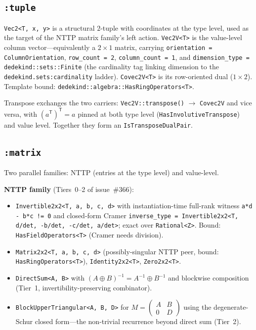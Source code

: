 \documentclass[11pt, a4paper]{report}
\begin{document}
\subsection{\texttt{:tuple}}

\texttt{Vec2<T, x, y>} is a structural $2$-tuple with coordinates at the type level, used as the target of the NTTP matrix family's left action. \texttt{Vec2V<T>} is the value-level column vector---equivalently a $2 \times 1$ matrix, carrying \texttt{orientation = ColumnOrientation}, \texttt{row\_count = 2}, \texttt{column\_count = 1}, and \texttt{dimension\_type = dedekind::sets::Finite} (the cardinality tag linking dimension to the \texttt{dedekind.sets:cardinality} ladder). \texttt{Covec2V<T>} is its row-oriented dual ($1 \times 2$). Template bound: \texttt{dedekind::algebra::HasRingOperators<T>}.

Transpose exchanges the two carriers: \texttt{Vec2V::transpose()} $\to$ \texttt{Covec2V} and vice versa, with $(a^{\mathsf{T}})^{\mathsf{T}} = a$ pinned at both type level (\texttt{HasInvolutiveTranspose}) and value level. Together they form an \texttt{IsTransposeDualPair}.

\subsection{\texttt{:matrix}}

Two parallel families: NTTP (entries at the type level) and value-level.

\textbf{NTTP family} (Tiers~0--2 of issue~\#366):
\begin{itemize}
  \item \texttt{Invertible2x2<T, a, b, c, d>} with instantiation-time full-rank witness \texttt{a*d - b*c != 0} and closed-form Cramer \texttt{inverse\_type = Invertible2x2<T, d/det, -b/det, -c/det, a/det>}; exact over \texttt{Rational<Z>}. Bound: \texttt{HasFieldOperators<T>} (Cramer needs division).
  \item \texttt{Matrix2x2<T, a, b, c, d>} (possibly-singular NTTP peer, bound: \texttt{HasRingOperators<T>}), \texttt{Identity2x2<T>}, \texttt{Zero2x2<T>}.
  \item \texttt{DirectSum<A, B>} with $(A \oplus B)^{-1} = A^{-1} \oplus B^{-1}$ and blockwise composition (Tier~1, invertibility-preserving combinator).
  \item \texttt{BlockUpperTriangular<A, B, D>} for $M = \begin{pmatrix} A & B \\ 0 & D \end{pmatrix}$ using the degenerate-Schur closed form---the non-trivial recurrence beyond direct sum (Tier~2).
\end{itemize}
\end{document}
